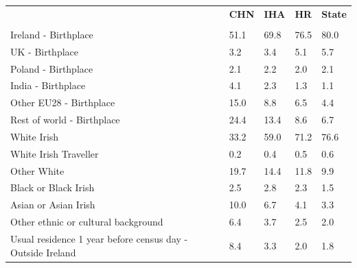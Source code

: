 \documentclass{article}
\begin{document}
\pagebreak
\begin{table}[h]	
\centering
		\begin{tabular}{KTTTT}
  \hline
& \textbf{CHN} & \textbf{IHA} & \textbf{HR}& \textbf{State}\\ 
  \hline
    \\ 
    \hline
Ireland - Birthplace & 51.1& 69.8& 76.5& 80.0\\
UK - Birthplace & 3.2& 3.4& 5.1& 5.7\\
Poland - Birthplace & 2.1& 2.2& 2.0& 2.1\\
India - Birthplace & 4.1& 2.3& 1.3& 1.1\\
Other EU28 - Birthplace & 15.0&  8.8&  6.5&  4.4\\
Rest of world - Birthplace & 24.4& 13.4&  8.6&  6.7\\
    \hline
White Irish & 33.2& 59.0& 71.2& 76.6\\
White Irish Traveller & 0.2& 0.4& 0.5& 0.6\\
Other White & 19.7& 14.4& 11.8&  9.9\\
Black or Black Irish & 2.5& 2.8& 2.3& 1.5\\
Asian or Asian Irish & 10.0&  6.7&  4.1&  3.3\\
Other ethnic or cultural background & 6.4& 3.7& 2.5& 2.0\\
    \hline
Usual residence 1 year before census day - Outside Ireland & 8.4& 3.3& 2.0& 1.8\\


\end{tabular}
\end{table}
\end{document}
